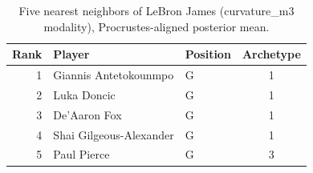 \begin{table}[htbp]
  \centering\small
  \begin{tabular}{rllc}
    \toprule
    Rank & Player & Position & Archetype \\
    \midrule
    1 & Giannis Antetokounmpo & G & 1 \\
    2 & Luka Doncic & G & 1 \\
    3 & De'Aaron Fox & G & 1 \\
    4 & Shai Gilgeous-Alexander & G & 1 \\
    5 & Paul Pierce & G & 3 \\
    \bottomrule
  \end{tabular}
  \caption{Five nearest neighbors of LeBron James (curvature_m3 modality), Procrustes-aligned posterior mean.}
  \label{tab:LeBron_James_neighbors_curvature_m3}
\end{table}

